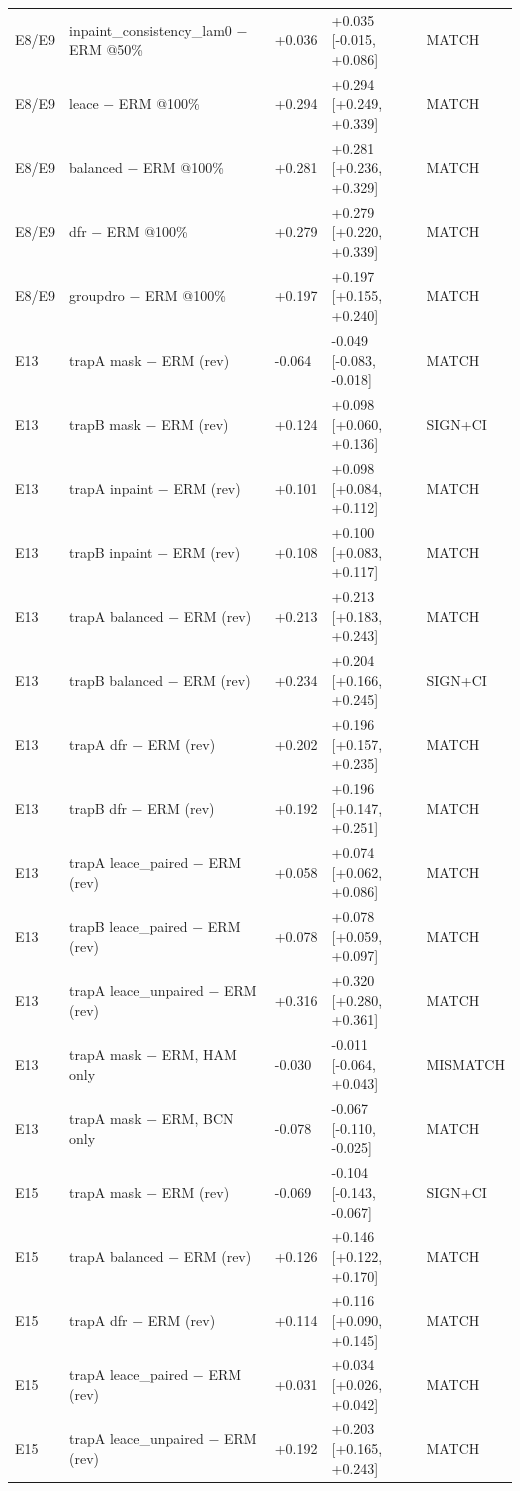 {\begin{longtable}{llp{1.7cm}p{3.3cm}l}
E8/E9 & inpaint\_consistency\_lam0 $-$ ERM @50\% & +0.036 & +0.035 [-0.015, +0.086] & MATCH \\
E8/E9 & leace $-$ ERM @100\% & +0.294 & +0.294 [+0.249, +0.339] & MATCH \\
E8/E9 & balanced $-$ ERM @100\% & +0.281 & +0.281 [+0.236, +0.329] & MATCH \\
E8/E9 & dfr $-$ ERM @100\% & +0.279 & +0.279 [+0.220, +0.339] & MATCH \\
E8/E9 & groupdro $-$ ERM @100\% & +0.197 & +0.197 [+0.155, +0.240] & MATCH \\
E13 & trapA mask $-$ ERM (rev) & -0.064 & -0.049 [-0.083, -0.018] & MATCH \\
E13 & trapB mask $-$ ERM (rev) & +0.124 & +0.098 [+0.060, +0.136] & SIGN+CI \\
E13 & trapA inpaint $-$ ERM (rev) & +0.101 & +0.098 [+0.084, +0.112] & MATCH \\
E13 & trapB inpaint $-$ ERM (rev) & +0.108 & +0.100 [+0.083, +0.117] & MATCH \\
E13 & trapA balanced $-$ ERM (rev) & +0.213 & +0.213 [+0.183, +0.243] & MATCH \\
E13 & trapB balanced $-$ ERM (rev) & +0.234 & +0.204 [+0.166, +0.245] & SIGN+CI \\
E13 & trapA dfr $-$ ERM (rev) & +0.202 & +0.196 [+0.157, +0.235] & MATCH \\
E13 & trapB dfr $-$ ERM (rev) & +0.192 & +0.196 [+0.147, +0.251] & MATCH \\
E13 & trapA leace\_paired $-$ ERM (rev) & +0.058 & +0.074 [+0.062, +0.086] & MATCH \\
E13 & trapB leace\_paired $-$ ERM (rev) & +0.078 & +0.078 [+0.059, +0.097] & MATCH \\
E13 & trapA leace\_unpaired $-$ ERM (rev) & +0.316 & +0.320 [+0.280, +0.361] & MATCH \\
E13 & trapA mask $-$ ERM, HAM only & -0.030 & -0.011 [-0.064, +0.043] & MISMATCH \\
E13 & trapA mask $-$ ERM, BCN only & -0.078 & -0.067 [-0.110, -0.025] & MATCH \\
E15 & trapA mask $-$ ERM (rev) & -0.069 & -0.104 [-0.143, -0.067] & SIGN+CI \\
E15 & trapA balanced $-$ ERM (rev) & +0.126 & +0.146 [+0.122, +0.170] & MATCH \\
E15 & trapA dfr $-$ ERM (rev) & +0.114 & +0.116 [+0.090, +0.145] & MATCH \\
E15 & trapA leace\_paired $-$ ERM (rev) & +0.031 & +0.034 [+0.026, +0.042] & MATCH \\
E15 & trapA leace\_unpaired $-$ ERM (rev) & +0.192 & +0.203 [+0.165, +0.243] & MATCH \\
\end{longtable}}
